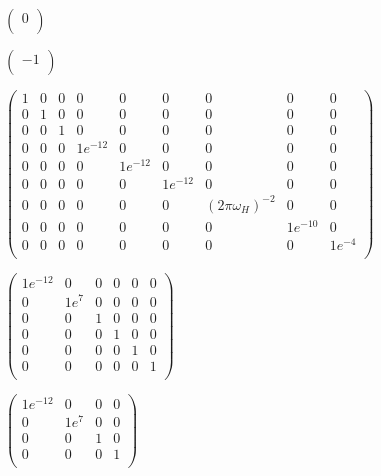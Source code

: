 \documentclass[a4paper,11pt,twoside,openright]{book}
\def\lthtmlcheckvsize{\ifdim\ht\sizebox<\vsize 
  \ifdim\wd\sizebox<\hsize\expandafter\hfill\fi \expandafter\vfill
  \else\expandafter\vss\fi}%
\begin{document}
{\newpage\clearpage
{}%
$\displaystyle \begin{pmatrix}
0 \\
\end{pmatrix}$%
\lthtmlindisplaymathZ
\lthtmlcheckvsize\clearpage}

{\newpage\clearpage
{}%
$\displaystyle \begin{pmatrix}
-1 \\
\end{pmatrix}$%
\lthtmlindisplaymathZ
\lthtmlcheckvsize\clearpage}

{\newpage\clearpage
{}%
$\displaystyle \begin{pmatrix}
1 &  0 &  0 &  0 &  0 &  0 &  0 &  0 &  0 \\
0 &  1 &  0 &  0 &  0 &  0 &  0 &  0 &  0 \\
0 &  0 &  1 &  0 &  0 &  0 &  0 &  0 &  0 \\
0 &  0 &  0 &  1e^{-12} &  0 &  0 &  0 &  0 &  0 \\
0 &  0 &  0 &  0 &  1e^{-12} &  0 &  0 &  0 &  0 \\
0 &  0 &  0 &  0 &  0 &  1e^{-12} &  0 &  0 &  0 \\
0 &  0 &  0 &  0 &  0 &  0 &  (2\pi \omega_H)^{-2} &  0 &  0 \\
0 &  0 &  0 &  0 &  0 &  0 &  0 &  1e^{-10} &  0 \\
0 &  0 &  0 &  0 &  0 &  0 &  0 &  0 &  1e^{-4} \\
\end{pmatrix}$%
\lthtmlindisplaymathZ
\lthtmlcheckvsize\clearpage}

{\newpage\clearpage
{}%
$\displaystyle \begin{pmatrix}
1e^{-12} &  0 &  0 &  0 &  0 &  0 \\
0 &  1e^7 &  0 &  0 &  0 &  0 \\
0 &  0 &  1 &  0 &  0 &  0 \\
0 &  0 &  0 &  1 &  0 &  0 \\
0 &  0 &  0 &  0 &  1 &  0 \\
0 &  0 &  0 &  0 &  0 &  1 \\
\end{pmatrix}$%
\lthtmlindisplaymathZ
\lthtmlcheckvsize\clearpage}

{\newpage\clearpage
{}%
$\displaystyle \begin{pmatrix}
1e^{-12} &  0 &  0 &  0 \\
0 &  1e^7 &  0 &  0 \\
0 &  0 &  1 &  0 \\
0 &  0 &  0 &  1 \\
\end{pmatrix}$%
\lthtmlindisplaymathZ
\lthtmlcheckvsize\clearpage}
\end{document}
